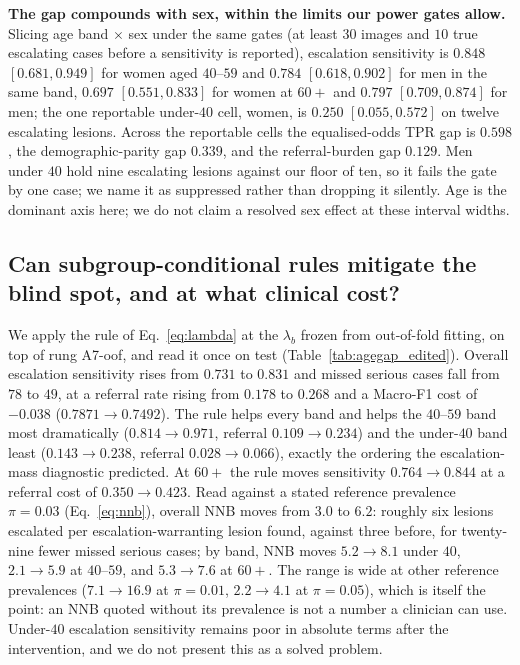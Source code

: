 \documentclass[journal]{IEEEtran}
\begin{document}
\textbf{The gap compounds with sex, within the limits our power gates allow.} Slicing age band
$\times$ sex under the same gates (at least $30$ images and $10$ true escalating cases before a
sensitivity is reported), escalation sensitivity is $0.848$ $[0.681,0.949]$ for women aged
$40$--$59$ and $0.784$ $[0.618,0.902]$ for men in the same band, $0.697$ $[0.551,0.833]$ for
women at $60+$ and $0.797$ $[0.709,0.874]$ for men; the one reportable under-$40$ cell, women,
is $0.250$ $[0.055,0.572]$ on twelve escalating lesions. Across the reportable cells the
equalised-odds TPR gap is $0.598$, the demographic-parity gap $0.339$, and the referral-burden
gap $0.129$. Men under $40$ hold nine escalating lesions against our floor of ten, so it fails the gate by one case; we name it as suppressed rather than dropping it silently. Age is the
dominant axis here; we do not claim a resolved sex effect at these interval widths.

\subsection{Can subgroup-conditional rules mitigate the blind spot, and at what clinical cost?}
\label{sec:results-utility}

We apply the rule of Eq.~\eqref{eq:lambda} at the $\lambda_b$ frozen from out-of-fold fitting,
on top of rung A7-oof, and read it once on test (Table~\ref{tab:agegap_edited}). Overall
escalation sensitivity rises from $0.731$ to $0.831$ and missed serious cases fall from $78$ to
$49$, at a referral rate rising from $0.178$ to $0.268$ and a Macro-F1 cost of $-0.038$
($0.7871\rightarrow0.7492$). The rule helps every band and helps the $40$--$59$ band most
dramatically ($0.814\rightarrow0.971$, referral $0.109\rightarrow0.234$) and the under-$40$
band least ($0.143\rightarrow0.238$, referral $0.028\rightarrow0.066$), exactly the ordering the
escalation-mass diagnostic predicted. At $60+$ the rule moves sensitivity $0.764\rightarrow0.844$
at a referral cost of $0.350\rightarrow0.423$. Read against a stated reference prevalence
$\pi=0.03$ (Eq.~\eqref{eq:nnb}), overall NNB moves from $3.0$ to $6.2$: roughly six lesions
escalated per escalation-warranting lesion found, against three before, for twenty-nine fewer
missed serious cases; by band, NNB moves $5.2\rightarrow8.1$ under $40$, $2.1\rightarrow5.9$ at
$40$--$59$, and $5.3\rightarrow7.6$ at $60+$. The range is wide at other reference prevalences
($7.1\rightarrow16.9$ at $\pi=0.01$, $2.2\rightarrow4.1$ at $\pi=0.05$), which is itself the
point: an NNB quoted without its prevalence is not a number a clinician can use. Under-$40$
escalation sensitivity remains poor in absolute terms after the intervention, and we do not
present this as a solved problem.
\end{document}
